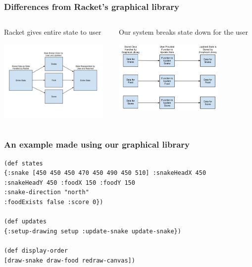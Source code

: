 \documentclass{beamer}
\newcommand{\comment}[1]{{\bf \tt  {#1}}}
\newcommand{\todo}[1]{\textcolor{blue}{\comment{To Do: {#1}}}}
\begin{document}
\begin{frame}
\frametitle{Differences from Racket's graphical library}
\begin{columns}[T]
\begin{column}{.5\textwidth}
\begin{block}{Racket gives entire state to user}
\begin{center}
\includegraphics[width=150pt]{Rackets_State_Diagram}
\end{center}
\end{block}
\end{column}
\begin{column}{.5\textwidth}
\begin{block}{Our system breaks state down for the user}
\begin{center}
\includegraphics[width=150pt]{Handling_State_in_Graphical_Library}
\end{center}
\end{block}
\end{column}
\end{columns}
\end{frame}

\begin{frame} [fragile]
\frametitle{An example made using our graphical library}
\begin{verbatim}
(def states
{:snake [450 450 450 470 450 490 450 510] :snakeHeadX 450
:snakeHeadY 450 :foodX 150 :foodY 150 
:snake-direction "north"
:foodExists false :score 0})

(def updates
{:setup-drawing setup :update-snake update-snake})

(def display-order
[draw-snake draw-food redraw-canvas])
\end{verbatim}
\end{frame}
\end{document}
